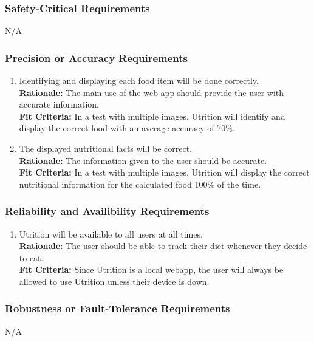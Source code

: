 \documentclass[12pt]{article}
\begin{document}
\subsubsection{Safety-Critical Requirements}
\hspace{1.5cm}N/A

\subsubsection{Precision or Accuracy Requirements}

\begin{enumerate}[start=4,label={PR\arabic*.}]
	\item Identifying and displaying each food item will be done correctly. \\
	\textbf{Rationale:} The main use of the web app should provide the user with accurate information. \\
	\textbf{Fit Criteria:} In a test with multiple images, Utrition will identify and display the correct food with an average accuracy of 70\%.
	\item  The displayed nutritional facts will be correct. \\
	\textbf{Rationale:} The information given to the user should be accurate. \\
	\textbf{Fit Criteria:} In a test with multiple images, Utrition will display the correct nutritional information for the calculated food 100\% of the time.
\end{enumerate}

\subsubsection{Reliability and Availibility Requirements}

\begin{enumerate}[{PR}6. ] 
	\item Utrition will be available to all users at all times.\\
	\textbf{Rationale:} The user should be able to track their diet whenever they decide to eat. \\
	\textbf{Fit Criteria:} Since Utrition is a local webapp, the user will always be allowed to use Utrition unless their device is down.
\end{enumerate}

\subsubsection{Robustness or Fault-Tolerance Requirements}
\hspace{1.5cm}N/A
\end{document}

